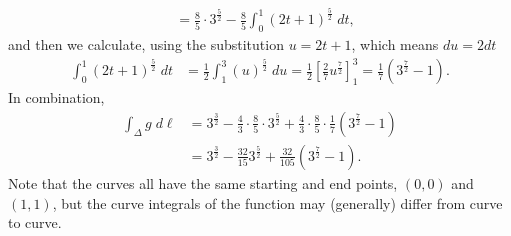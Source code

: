 \documentclass[11pt]{article}
\begin{document}
\begin{solution}
\begin{align*}
        \\&=
        \frac 8 5 \cdot 3^{\frac 5 2}
        -
        \frac 8 5 
        \int_0^1 \left( 2t + 1 \right)^{\frac 5 2} \;dt
        ,
    \end{align*}
    and then we calculate, using the substitution $u = 2t + 1$, which means $du = 2 dt$
    \begin{align*}
        \int_0^1 \left( 2t + 1 \right)^{\frac 5 2} \;dt
        &=
        \frac 1 2 
        \int_1^3 \left( u \right)^{\frac 5 2} \;du
        =
        \frac 1 2 
        \left[ \frac 2 7 u^{\frac 7 2}\right]_1^3
        =
        \frac 1 7 
        \left( 3^{\frac 7 2} - 1 \right)
        .
    \end{align*}
    In combination,
    \begin{align}
        \int_\Delta g \;d\ell 
        &= 
        3^{\frac 3 2} - \frac 4 3 \cdot \frac 8 5 \cdot 3^{\frac 5 2} + \frac 4 3 \cdot \frac 8 5 \cdot \frac 1 7 \left( 3^{\frac 7 2} - 1 \right)
        \\&=
        3^{\frac 3 2} - \frac{32}{15} 3^{\frac 5 2} + \frac{32}{105} \left( 3^{\frac 7 2} - 1 \right)
        .
    \end{align}
    Note that the curves all have the same starting and end points, $(0,0)$ and $(1,1)$, 
    but the curve integrals of the function may (generally) differ from curve to curve.  
\end{solution}
\end{document}
